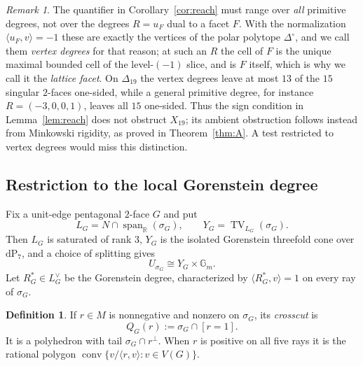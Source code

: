 \documentclass[11pt]{amsart}
\theoremstyle{definition}
\newtheorem{definition}[theorem]{Definition}
\theoremstyle{remark}
\newtheorem{remark}[theorem]{Remark}
\theoremstyle{plain}
\newcommand{\RR}{\mathbb{R}}
\newcommand{\conv}{\operatorname{conv}}
\newcommand{\dP}{\mathrm{dP}}
\newcommand{\TV}{\operatorname{TV}}
\begin{document}
\begin{remark}\label{rem:reachscope}
The quantifier in Corollary~\ref{cor:reach} must range over \emph{all} primitive
degrees, not over the degrees $R = u_F$ dual to a facet $F$.  With the
normalization $\langle u_F,v\rangle=-1$ these are exactly the vertices of the
polar polytope $\Delta^\circ$, and we call them \emph{vertex degrees} for that
reason; at such an $R$ the cell of $F$ is the unique maximal bounded cell of
the level-$(-1)$ slice, and is $F$ itself, which is why we call it the
\emph{lattice facet}.  On
$\Delta_{19}$ the vertex degrees leave at most $13$ of the $15$ singular
$2$-faces one-sided, while a general primitive degree, for instance
$R = (-3,0,0,1)$, leaves all $15$ one-sided.  Thus the sign condition in Lemma~\ref{lem:reach} does not obstruct
$X_{19}$; its ambient obstruction follows instead from Minkowski
rigidity, as proved in Theorem~\ref{thm:A}.  A test restricted to
vertex degrees would miss this distinction.
\end{remark}

\subsection{Restriction to the local Gorenstein degree}

Fix a unit-edge pentagonal $2$-face $G$ and put
\[
 L_G=N\cap\operatorname{span}_{\RR}(\sigma_G),\qquad
 Y_G=\TV_{L_G}(\sigma_G).
\]
Then $L_G$ is saturated of rank $3$, $Y_G$ is the isolated Gorenstein
threefold cone over $\dP_7$, and a choice of splitting gives
\[
 U_{\sigma_G}\cong Y_G\times\mathbb G_m.
\]
Let $R_G^*\in L_G^\vee$ be the Gorenstein degree, characterized by
$\langle R_G^*,v\rangle=1$ on every ray of $\sigma_G$.

\begin{definition}\label{def:crosscut}
If $r\in M$ is nonnegative and nonzero on $\sigma_G$, its \emph{crosscut} is
\[
 Q_G(r):=\sigma_G\cap[r=1].
\]
It is a polyhedron with tail $\sigma_G\cap r^\perp$.  When $r$ is positive on
all five rays it is the rational polygon
$\conv\{v/\langle r,v\rangle:v\in V(G)\}$.
\end{definition}
\end{document}
